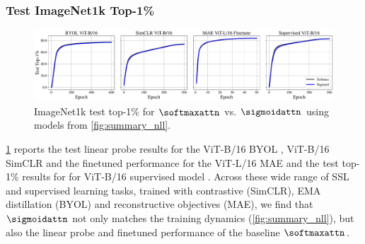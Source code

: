 \subsubsection{Test ImageNet1k Top-1\%}
\label{app:top1_results}
\begin{figure}[htbp]
    \centering
    \includegraphics[width=\textwidth]{figures/test_top1_linear_probe_and_MAE_FT.pdf}
    \caption{ImageNet1k test top-1\% for $\softmaxattn$ vs. $\sigmoidattn$ using models from \cref{fig:summary_nll}. %
    }
    \label{fig:test_top1_results}
\end{figure}
\cref{fig:test_top1_results} reports the test linear probe results for the ViT-B/16 BYOL \citep{DBLP:conf/nips/GrillSATRBDPGAP20, DBLP:conf/nips/BusbridgeRALDCW23}, ViT-B/16 SimCLR \citep{DBLP:conf/icml/ChenK0H20, DBLP:conf/icml/ZhaiLLBR0GS23} and the finetuned performance for the ViT-L/16 MAE \citep{DBLP:conf/cvpr/HeCXLDG22} and the test top-1\% results for for ViT-B/16 supervised model \citep{DBLP:conf/iclr/DosovitskiyB0WZ21}.
Across these wide range of SSL and supervised learning tasks, trained with contrastive (SimCLR), EMA distillation (BYOL) and reconstructive objectives (MAE), we find that $\sigmoidattn$ not only matches the training dynamics (\cref{fig:summary_nll}), but also the linear probe and finetuned performance of the baseline $\softmaxattn$.
